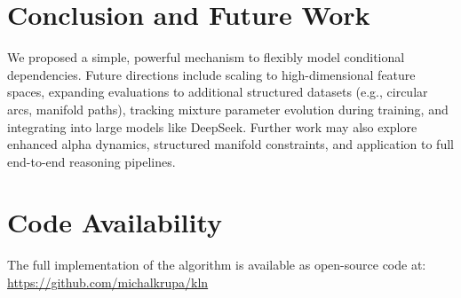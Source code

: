 \documentclass[11pt]{article}
\begin{document}
\section{Conclusion and Future Work}
We proposed a simple, powerful mechanism to flexibly model conditional dependencies. Future directions include scaling to high-dimensional feature spaces, expanding evaluations to additional structured datasets (e.g., circular arcs, manifold paths), tracking mixture parameter evolution during training, and integrating into large models like DeepSeek. Further work may also explore enhanced alpha dynamics, structured manifold constraints, and application to full end-to-end reasoning pipelines.

\section{Code Availability}
The full implementation of the algorithm is available as open-source code at: \url{https://github.com/michalkrupa/kln}


\end{document}
